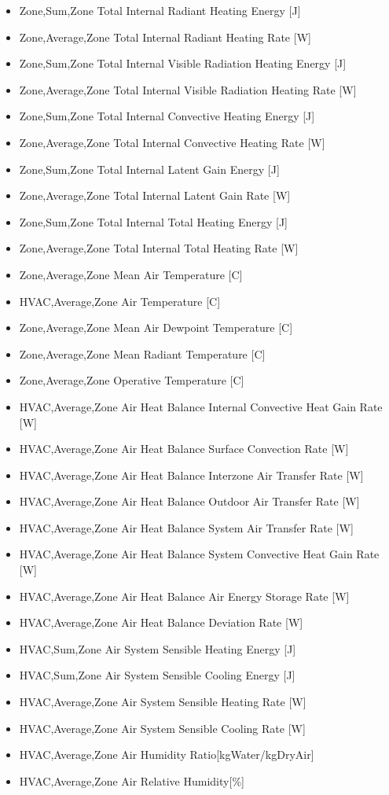 \begin{itemize}
\item
  Zone,Sum,Zone Total Internal Radiant Heating Energy {[}J{]}
\item
  Zone,Average,Zone Total Internal Radiant Heating Rate {[}W{]}
\item
  Zone,Sum,Zone Total Internal Visible Radiation Heating Energy {[}J{]}
\item
  Zone,Average,Zone Total Internal Visible Radiation Heating Rate {[}W{]}
\item
  Zone,Sum,Zone Total Internal Convective Heating Energy {[}J{]}
\item
  Zone,Average,Zone Total Internal Convective Heating Rate {[}W{]}
\item
  Zone,Sum,Zone Total Internal Latent Gain Energy {[}J{]}
\item
  Zone,Average,Zone Total Internal Latent Gain Rate {[}W{]}
\item
  Zone,Sum,Zone Total Internal Total Heating Energy {[}J{]}
\item
  Zone,Average,Zone Total Internal Total Heating Rate {[}W{]}
\item
  Zone,Average,Zone Mean Air Temperature {[}C{]}
\item
  HVAC,Average,Zone Air Temperature {[}C{]}
\item
  Zone,Average,Zone Mean Air Dewpoint Temperature {[}C{]}
\item
  Zone,Average,Zone Mean Radiant Temperature {[}C{]}
\item
  Zone,Average,Zone Operative Temperature {[}C{]}
\item
  HVAC,Average,Zone Air Heat Balance Internal Convective Heat Gain Rate {[}W{]}
\item
  HVAC,Average,Zone Air Heat Balance Surface Convection Rate {[}W{]}
\item
  HVAC,Average,Zone Air Heat Balance Interzone Air Transfer Rate {[}W{]}
\item
  HVAC,Average,Zone Air Heat Balance Outdoor Air Transfer Rate {[}W{]}
\item
  HVAC,Average,Zone Air Heat Balance System Air Transfer Rate {[}W{]}
\item
  HVAC,Average,Zone Air Heat Balance System Convective Heat Gain Rate {[}W{]}
\item
  HVAC,Average,Zone Air Heat Balance Air Energy Storage Rate {[}W{]}
\item
  HVAC,Average,Zone Air Heat Balance Deviation Rate {[}W{]}
\item
  HVAC,Sum,Zone Air System Sensible Heating Energy {[}J{]}
\item
  HVAC,Sum,Zone Air System Sensible Cooling Energy {[}J{]}
\item
  HVAC,Average,Zone Air System Sensible Heating Rate {[}W{]}
\item
  HVAC,Average,Zone Air System Sensible Cooling Rate {[}W{]}
\item
  HVAC,Average,Zone Air Humidity Ratio{[}kgWater/kgDryAir{]}
\item
  HVAC,Average,Zone Air Relative Humidity{[}\%{]}
\end{itemize}

